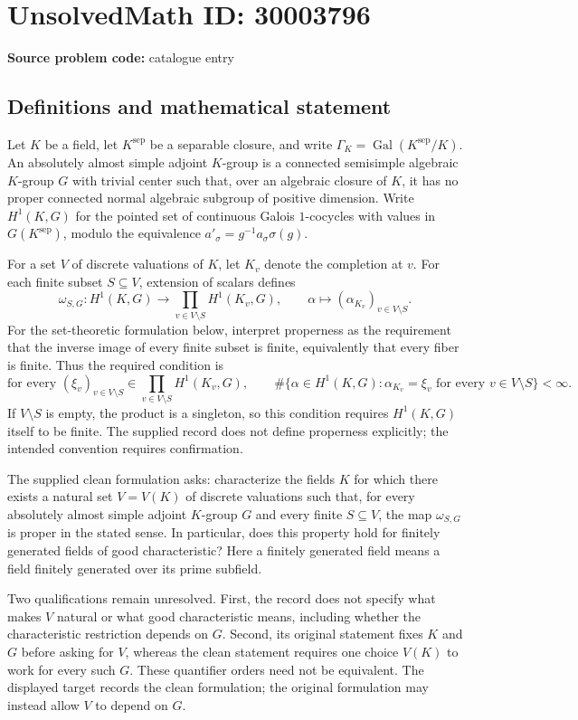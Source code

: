\documentclass[11pt]{article}
\begin{document}
\section*{UnsolvedMath ID: 30003796}
\textbf{Source problem code:} catalogue entry
\subsection{Definitions and mathematical statement}
Let \(K\) be a field, let \(K^{\mathrm{sep}}\) be a separable closure, and write \(\Gamma_K=\operatorname{Gal}(K^{\mathrm{sep}}/K)\). An absolutely almost simple adjoint \(K\)-group is a connected semisimple algebraic \(K\)-group \(G\) with trivial center such that, over an algebraic closure of \(K\), it has no proper connected normal algebraic subgroup of positive dimension. Write \(H^1(K,G)\) for the pointed set of continuous Galois \(1\)-cocycles with values in \(G(K^{\mathrm{sep}})\), modulo the equivalence \(a'_\sigma=g^{-1}a_\sigma\sigma(g)\).

For a set \(V\) of discrete valuations of \(K\), let \(K_v\) denote the completion at \(v\). For each finite subset \(S\subseteq V\), extension of scalars defines
\[
\omega_{S,G}:H^1(K,G)\longrightarrow\prod_{v\in V\setminus S}H^1(K_v,G),\qquad
\alpha\longmapsto(\alpha_{K_v})_{v\in V\setminus S}.
\]
For the set-theoretic formulation below, interpret properness as the requirement that the inverse image of every finite subset is finite, equivalently that every fiber is finite. Thus the required condition is
\[
\text{for every }(\xi_v)_{v\in V\setminus S}\in
\prod_{v\in V\setminus S}H^1(K_v,G),\qquad
\#\{\alpha\in H^1(K,G):\alpha_{K_v}=\xi_v\text{ for every }v\in V\setminus S\}<\infty.
\]
If \(V\setminus S\) is empty, the product is a singleton, so this condition requires \(H^1(K,G)\) itself to be finite. The supplied record does not define properness explicitly; the intended convention requires confirmation.

The supplied clean formulation asks: characterize the fields \(K\) for which there exists a natural set \(V=V(K)\) of discrete valuations such that, for every absolutely almost simple adjoint \(K\)-group \(G\) and every finite \(S\subseteq V\), the map \(\omega_{S,G}\) is proper in the stated sense. In particular, does this property hold for finitely generated fields of good characteristic? Here a finitely generated field means a field finitely generated over its prime subfield.

Two qualifications remain unresolved. First, the record does not specify what makes \(V\) natural or what good characteristic means, including whether the characteristic restriction depends on \(G\). Second, its original statement fixes \(K\) and \(G\) before asking for \(V\), whereas the clean statement requires one choice \(V(K)\) to work for every such \(G\). These quantifier orders need not be equivalent. The displayed target records the clean formulation; the original formulation may instead allow \(V\) to depend on \(G\).
\end{document}
